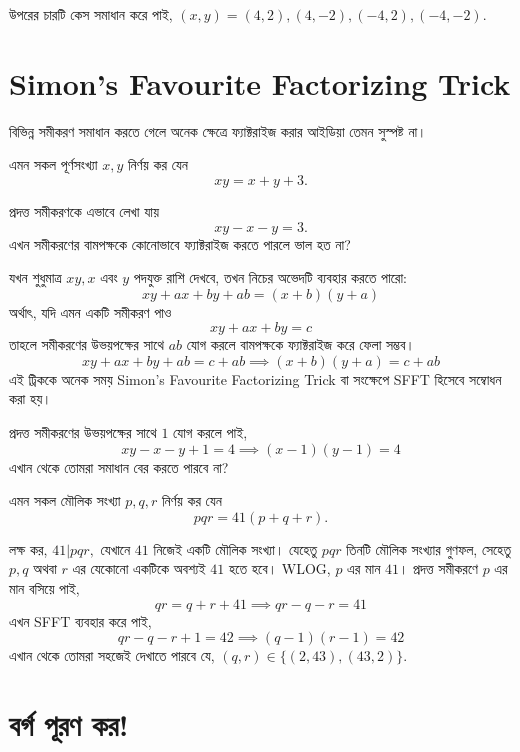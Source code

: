 \documentclass[11pt]{report}
\begin{document}
উপরের চারটি কেস সমাধান করে পাই, $(x,y)=(4,2),(4,-2),(-4,2),(-4,-2).$\\

\section{Simon's Favourite Factorizing Trick}

বিভিন্ন সমীকরণ সমাধান করতে গেলে অনেক ক্ষেত্রে ফ্যাক্টরাইজ করার আইডিয়া তেমন সুস্পষ্ট না।\\

\begin{tcolorbox}[colframe=black!80!green,title=উদাহরণ 1.4.1]
এমন সকল পূর্ণসংখ্যা $x, y$ নির্ণয় কর যেন $$xy=x+y+3.$$
\end{tcolorbox}

প্রদত্ত সমীকরণকে এভাবে লেখা যায় $$xy-x-y=3.$$ এখন সমীকরণের বামপক্ষকে কোনোভাবে ফ্যাক্টরাইজ করতে পারলে ভাল হত না?\\

\begin{tcolorbox}[colframe=blue!80!blue]
যখন শুধুমাত্র $xy, x$ এবং $y$ পদযুক্ত রাশি দেখবে, তখন নিচের অভেদটি ব্যবহার করতে পারো: $$xy+ax+by+ab=(x+b)(y+a)$$ অর্থাৎ, যদি এমন একটি সমীকরণ পাও $$xy+ax+by=c$$ তাহলে সমীকরণের উভয়পক্ষের সাথে $ab$ যোগ করলে বামপক্ষকে ফ্যাক্টরাইজ করে ফেলা সম্ভব। $$xy+ax+by+ab=c+ab \implies (x+b)(y+a)=c+ab$$ এই ট্রিককে অনেক সময় Simon's Favourite Factorizing Trick বা সংক্ষেপে SFFT হিসেবে সম্বোধন করা হয়। 
\end{tcolorbox}

প্রদত্ত সমীকরণের উভয়পক্ষের সাথে $1$ যোগ করলে পাই, $$xy-x-y+1=4 \implies (x-1)(y-1) = 4$$ এখান থেকে তোমরা সমাধান বের করতে পারবে না?\\

\begin{tcolorbox}[colframe=black!80!green,title=উদাহরণ 1.4.2]
এমন সকল মৌলিক সংখ্যা $p, q, r$ নির্ণয় কর যেন $$ pqr = 41 (p+q+r). $$
\end{tcolorbox}

লক্ষ কর, $ 41 | pqr ,$ যেখানে $41$ নিজেই একটি মৌলিক সংখ্যা। যেহেতু $pqr$ তিনটি মৌলিক সংখ্যার গুণফল, সেহেতু $p, q$ অথবা $r$ এর যেকোনো একটিকে অবশ্যই $41$ হতে হবে। WLOG, $p$ এর মান $41$। প্রদত্ত সমীকরণে $p$ এর মান বসিয়ে পাই, $$qr = q+r+41 \implies qr-q-r=41$$
এখন SFFT ব্যবহার করে পাই, $$qr-q-r+1=42 \implies (q-1)(r-1)=42$$
এখান থেকে তোমরা সহজেই দেখাতে পারবে যে, $(q,r) \in \{(2, 43), (43, 2)\}.$\\

\section{বর্গ পূরণ কর!}
\end{document}
